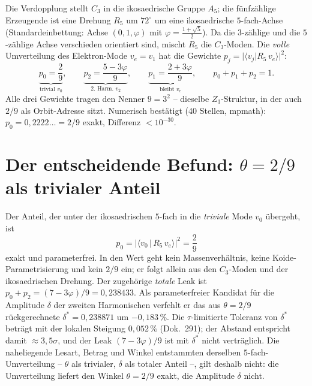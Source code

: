 Die Verdopplung stellt $C_3$ in die ikosaedrische Gruppe $A_5$; die fünfzählige Erzeugende ist
eine Drehung $R_5$ um $72^\circ$ um eine ikosaedrische $5$-fach-Achse (Standardeinbettung:
Achse $(0,1,\varphi)$ mit $\varphi=\tfrac{1+\sqrt5}{2}$). Da die $3$-zählige und die $5$-zählige
Achse verschieden orientiert sind, mischt $R_5$ die $C_3$-Moden. Die \emph{volle} Umverteilung
des Elektron-Mode $v_e=v_1$ hat die Gewichte $p_j=\lvert\langle v_j\vert R_5\,v_e\rangle\rvert^2$:
\[
\underbrace{p_0=\frac{2}{9}}_{\text{trivial }v_0},\qquad
\underbrace{p_2=\frac{5-3\varphi}{9}}_{\text{2.\ Harm.\ }v_2},\qquad
\underbrace{p_1=\frac{2+3\varphi}{9}}_{\text{bleibt }v_e},\qquad p_0+p_1+p_2=1.
\]
Alle drei Gewichte tragen den Nenner $9=3^2$ -- dieselbe $Z_3$-Struktur, in der auch $2/9$ als
Orbit-Adresse sitzt. Numerisch bestätigt (40 Stellen, mpmath): $p_0=0{,}2222\ldots=2/9$ exakt,
Differenz $<10^{-30}$.

\section{Der entscheidende Befund: $\theta=2/9$ als trivialer Anteil}
Der Anteil, der unter der ikosaedrischen $5$-fach in die \emph{triviale} Mode $v_0$ übergeht, ist
\[
\boxed{\;p_0=\big\lvert\langle v_0\,\vert\,R_5\,v_e\rangle\big\rvert^2=\frac{2}{9}\;}
\]
exakt und parameterfrei. In den Wert geht kein Massenverhältnis, keine Koide-Parametrisierung
und kein $2/9$ ein; er folgt allein aus den $C_3$-Moden und der ikosaedrischen Drehung. Der
zugehörige \emph{totale} Leak ist $p_0+p_2=(7-3\varphi)/9=0{,}238433$. Als parameterfreier
Kandidat für die Amplitude $\delta$ der zweiten Harmonischen verfehlt er das aus $\theta=2/9$
rückgerechnete $\delta^\ast=0{,}238871$ um $-0{,}183\,\%$. Die $\tau$-limitierte Toleranz von
$\delta^\ast$ beträgt mit der lokalen Steigung $0{,}052\,\%$ (Dok.~291); der Abstand entspricht damit
$\approx3{,}5\sigma$, und der Leak $(7-3\varphi)/9$ ist mit $\delta^\ast$ nicht verträglich. Die
naheliegende Lesart, Betrag und Winkel entstammten derselben $5$-fach-Umverteilung -- $\theta$ als
trivialer, $\delta$ als totaler Anteil --, gilt deshalb nicht: die Umverteilung liefert den Winkel
$\theta=2/9$ exakt, die Amplitude $\delta$ nicht.

